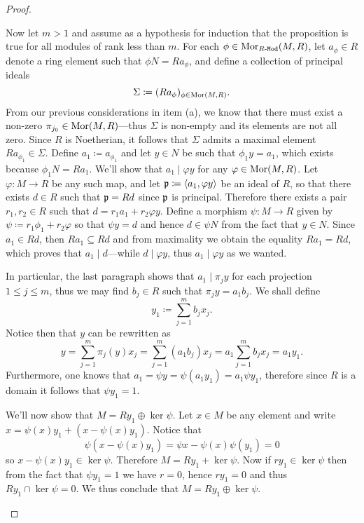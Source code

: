 \begin{proof}
\begin{enumerate}[(a)]
  Now let \(m > 1\) and assume as a hypothesis for induction that the
  proposition is true for all modules of rank less than \(m\). For each
  \(\phi \in \operatorname{Mor}_{{R\text{-}\texttt{Mod}}}(M, R)\), let \(a_{\phi} \in R\) denote a ring element
  such that \(\phi N = R a_{\phi}\), and define a collection of principal ideals
  \[
  \Sigma \coloneq (R a_{\phi})_{\phi \in \operatorname{Mor}(M, R)}.
  \]
  From our previous considerations in item (a), we know that there must exist a
  non-zero \(\pi_{j_0} \in \operatorname{Mor}(M, R)\)---thus \(\Sigma\) is non-empty and its
  elements are not all zero. Since \(R\) is Noetherian, it follows that
  \(\Sigma\) admits a maximal element \(R a_{\phi_1} \in \Sigma\). Define
  \(a_1 \coloneq a_{\phi_1}\) and let \(y \in N\) be such that
  \(\phi_1 y = a_1\), which exists because \(\phi_1 N = R a_1\). We'll show that
  \(a_1 \mid \varphi y\) for any \(\varphi \in \operatorname{Mor}(M, R)\). Let
  \(\varphi: M \to R\) be any such map, and let
  \(\mathfrak{p} \coloneq \langle a_1, \varphi y \rangle\) be an ideal of \(R\), so
  that there exists \(d \in R\) such that \(\mathfrak{p} = R d\) since \(\mathfrak{p}\)
  is principal. Therefore there exists a pair \(r_1, r_2 \in R\) such that
  \(d = r_1 a_1 + r_2 \varphi y\). Define a morphism \(\psi: M \to R\) given by
  \(\psi \coloneq r_1 \phi_1 + r_2 \varphi\) so that \(\psi y = d\) and hence
  \(d \in \psi N\) from the fact that \(y \in N\). Since \(a_1 \in R d\), then
  \(R a_1 \subseteq R d\) and from maximality we obtain the equality
  \(R a_1 = R d\), which proves that \(a_1 \mid d\)---while
  \(d \mid \varphi y\), thus \(a_1 \mid \varphi y\) as we wanted.

  In particular, the last paragraph shows that \(a_1 \mid \pi_j y\) for each
  projection \(1 \leq j \leq m\), thus we may find \(b_j \in R\) such that
  \(\pi_j y = a_1 b_j\). We shall define
  \[
  y_1 \coloneq \sum_{j=1}^m b_j x_j.
  \]
  Notice then that \(y\) can be rewritten as
  \begin{equation}\label{eq:y=a1y1-rewrite}
  y = \sum_{j=1}^m \pi_j(y) x_j
  = \sum_{j=1}^m (a_1 b_j) x_j
  = a_1 \sum_{j=1}^m b_j x_j
  = a_1 y_1.
  \end{equation}
  Furthermore, one knows that \(a_1 = \psi y = \psi (a_1 y_1) = a_1 \psi y_1\),
  therefore since \(R\) is a domain it follows that \(\psi y_1 = 1\).

  We'll now show that \(M = R y_1 \oplus \ker \psi\). Let \(x \in M\) be any
  element and write \(x = \psi(x) y_1 + (x - \psi(x) y_1)\). Notice that
  \begin{equation}\label{eq:x-psixy1-in-kernel}
  \psi(x - \psi(x) y_1) = \psi x - \psi(x) \psi(y_1) = 0
  \end{equation}
  so \(x - \psi(x) y_1 \in \ker \psi\). Therefore \(M = R y_1 + \ker \psi\). Now
  if \(r y_1 \in \ker \psi\) then from the fact that \(\psi y_1 = 1\) we have
  \(r = 0\), hence \(r y_1 = 0\) and thus \(R y_1 \cap \ker \psi = 0\). We thus
  conclude that \(M = R y_1 \oplus \ker \psi\).


\end{enumerate}
\end{proof}
